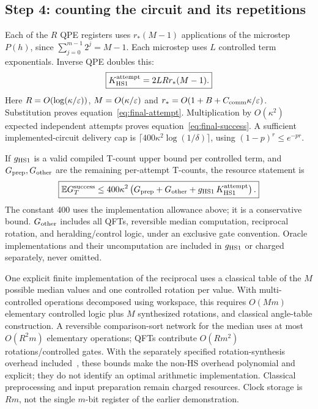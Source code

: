 \subsection{Step 4: counting the circuit and its repetitions}
Each of the $R$ QPE registers uses $r_*(M-1)$ applications of the microstep $P(h)$, since $\sum_{j=0}^{m-1}2^j=M-1$. Each microstep uses $L$ controlled term exponentials. Inverse QPE doubles this:
\begin{equation}\label{eq:exact-newcount}
 \boxed{K_{\mathrm{HS1}}^{\rm attempt}=2LRr_*(M-1).}
\end{equation}
Here $R=O(\log(\kappa/\varepsilon))$, $M=O(\kappa/\varepsilon)$ and
$r_*=O(1+B+C_{\mathrm{comm}}\kappa/\varepsilon)$. Substitution proves equation~\eqref{eq:final-attempt}. Multiplication by $O(\kappa^2)$ expected independent attempts proves equation~\eqref{eq:final-success}. A sufficient implemented-circuit delivery cap is $\lceil400\kappa^2\log(1/\delta)\rceil$, using $(1-p)^r\leq e^{-pr}$.

If $g_{\rm HS1}$ is a valid compiled T-count upper bound per controlled term, and $G_{\rm prep},G_{\rm other}$ are the remaining per-attempt T-counts, the resource statement is
\begin{equation}\label{eq:final-gates}
 \boxed{\mathbb E G_T^{\rm success}
 \leq 400\kappa^2\left(G_{\rm prep}+G_{\rm other}
       +g_{\rm HS1}\,K_{\mathrm{HS1}}^{\rm attempt}\right).}
\end{equation}
The constant 400 uses the implementation allowance above; it is a conservative bound. $G_{\rm other}$ includes all QFTs, reversible median computation, reciprocal rotation, and heralding/control logic, under an exclusive gate convention. Oracle implementations and their uncomputation are included in $g_{\rm HS1}$ or charged separately, never omitted.

One explicit finite implementation of the reciprocal uses a classical table of the $M$ possible median values and one controlled rotation per value. With multi-controlled operations decomposed using workspace, this requires $O(Mm)$ elementary controlled logic plus $M$ synthesized rotations, and classical angle-table construction. A reversible comparison-sort network for the median uses at most $O(R^2m)$ elementary operations; QFTs contribute $O(Rm^2)$ rotations/controlled gates. With the separately specified rotation-synthesis overhead included~\cite{synthesis}, these bounds make the non-HS overhead polynomial and explicit; they do not identify an optimal arithmetic implementation. Classical preprocessing and input preparation remain charged resources. Clock storage is $Rm$, not the single $m$-bit register of the earlier demonstration.

